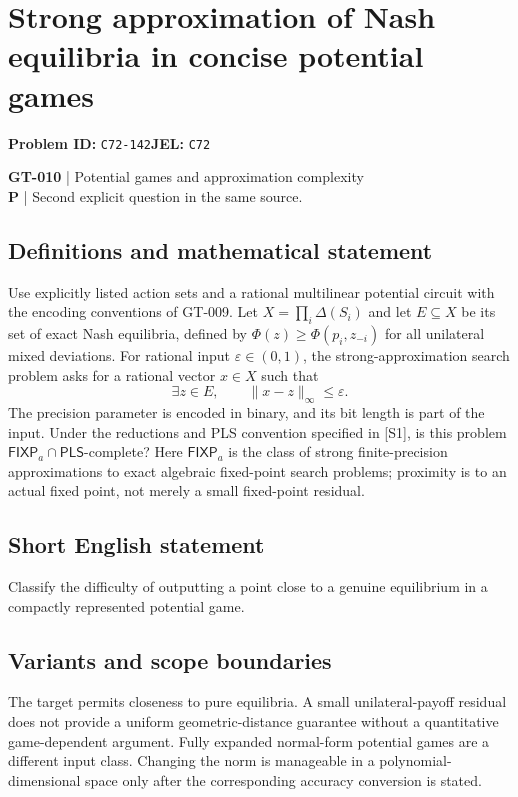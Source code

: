 \documentclass[11pt,a4paper]{article}
\begin{document}
\section*{Strong approximation of Nash equilibria in concise potential games}
\textbf{Problem ID:} \texttt{C72-142}\quad \textbf{JEL:} \texttt{C72}\par
\label{problem:OP-0140}
\label{game:GT-010}
{\sffamily\small\color{muted}
\textbf{GT-010} | Potential games and approximation complexity\\
\textbf{P} | Second explicit question in the same source.
\par}
\subsection*{Definitions and mathematical statement}
Use explicitly listed action sets and a rational multilinear potential circuit with the encoding conventions of GT-009. Let $X=\prod_i\Delta(S_i)$ and let $E\subseteq X$ be its set of exact Nash equilibria, defined by $\Phi(z)\geq\Phi(p_i,z_{-i})$ for all unilateral mixed deviations. For rational input $\varepsilon\in(0,1)$, the strong-approximation search problem asks for a rational vector $x\in X$ such that
\[
 \exists z\in E,\qquad \|x-z\|_\infty\leq\varepsilon.
\]
The precision parameter is encoded in binary, and its bit length is part of the input. Under the reductions and PLS convention specified in [S1], is this problem $\mathsf{FIXP}_a\cap\mathsf{PLS}$-complete? Here $\mathsf{FIXP}_a$ is the class of strong finite-precision approximations to exact algebraic fixed-point search problems; proximity is to an actual fixed point, not merely a small fixed-point residual.
\subsection*{Short English statement}
Classify the difficulty of outputting a point close to a genuine equilibrium in a compactly represented potential game.
\subsection*{Variants and scope boundaries}
The target permits closeness to pure equilibria. A small unilateral-payoff residual does not provide a uniform geometric-distance guarantee without a quantitative game-dependent argument. Fully expanded normal-form potential games are a different input class. Changing the norm is manageable in a polynomial-dimensional space only after the corresponding accuracy conversion is stated.
\end{document}
